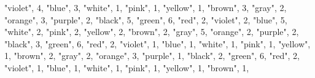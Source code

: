 \documentclass[
]{article}
\newenvironment{Shaded}{\begin{snugshade}}{\end{snugshade}}
\newcommand{\DecValTok}[1]{\textcolor[rgb]{0.00,0.00,0.81}{#1}}
\newcommand{\NormalTok}[1]{#1}
\newcommand{\StringTok}[1]{\textcolor[rgb]{0.31,0.60,0.02}{#1}}
\begin{document}
\begin{Shaded}
\begin{Highlighting}[]
  \StringTok{"violet"}\NormalTok{, }\DecValTok{4}\NormalTok{,}
  \StringTok{"blue"}\NormalTok{, }\DecValTok{3}\NormalTok{,}
  \StringTok{"white"}\NormalTok{, }\DecValTok{1}\NormalTok{,}
  \StringTok{"pink"}\NormalTok{, }\DecValTok{1}\NormalTok{,}
  \StringTok{"yellow"}\NormalTok{, }\DecValTok{1}\NormalTok{,}
  \StringTok{"brown"}\NormalTok{, }\DecValTok{3}\NormalTok{,}
  \StringTok{"gray"}\NormalTok{, }\DecValTok{2}\NormalTok{,}
  \StringTok{"orange"}\NormalTok{, }\DecValTok{3}\NormalTok{,}
  \StringTok{"purple"}\NormalTok{, }\DecValTok{2}\NormalTok{,}
    \StringTok{"black"}\NormalTok{, }\DecValTok{5}\NormalTok{,}
  \StringTok{"green"}\NormalTok{, }\DecValTok{6}\NormalTok{,}
  \StringTok{"red"}\NormalTok{, }\DecValTok{2}\NormalTok{,}
  \StringTok{"violet"}\NormalTok{, }\DecValTok{2}\NormalTok{,}
  \StringTok{"blue"}\NormalTok{, }\DecValTok{5}\NormalTok{,}
  \StringTok{"white"}\NormalTok{, }\DecValTok{2}\NormalTok{,}
  \StringTok{"pink"}\NormalTok{, }\DecValTok{2}\NormalTok{,}
  \StringTok{"yellow"}\NormalTok{, }\DecValTok{2}\NormalTok{,}
  \StringTok{"brown"}\NormalTok{, }\DecValTok{2}\NormalTok{,}
  \StringTok{"gray"}\NormalTok{, }\DecValTok{5}\NormalTok{,}
  \StringTok{"orange"}\NormalTok{, }\DecValTok{2}\NormalTok{,}
  \StringTok{"purple"}\NormalTok{, }\DecValTok{2}\NormalTok{,}
    \StringTok{"black"}\NormalTok{, }\DecValTok{3}\NormalTok{,}
  \StringTok{"green"}\NormalTok{, }\DecValTok{6}\NormalTok{,}
  \StringTok{"red"}\NormalTok{, }\DecValTok{2}\NormalTok{,}
  \StringTok{"violet"}\NormalTok{, }\DecValTok{1}\NormalTok{,}
  \StringTok{"blue"}\NormalTok{, }\DecValTok{1}\NormalTok{,}
  \StringTok{"white"}\NormalTok{, }\DecValTok{1}\NormalTok{,}
  \StringTok{"pink"}\NormalTok{, }\DecValTok{1}\NormalTok{,}
  \StringTok{"yellow"}\NormalTok{, }\DecValTok{1}\NormalTok{,}
  \StringTok{"brown"}\NormalTok{, }\DecValTok{2}\NormalTok{,}
  \StringTok{"gray"}\NormalTok{, }\DecValTok{2}\NormalTok{,}
  \StringTok{"orange"}\NormalTok{, }\DecValTok{3}\NormalTok{,}
  \StringTok{"purple"}\NormalTok{, }\DecValTok{1}\NormalTok{,}
    \StringTok{"black"}\NormalTok{, }\DecValTok{2}\NormalTok{,}
  \StringTok{"green"}\NormalTok{, }\DecValTok{6}\NormalTok{,}
  \StringTok{"red"}\NormalTok{, }\DecValTok{2}\NormalTok{,}
  \StringTok{"violet"}\NormalTok{, }\DecValTok{1}\NormalTok{,}
  \StringTok{"blue"}\NormalTok{, }\DecValTok{1}\NormalTok{,}
  \StringTok{"white"}\NormalTok{, }\DecValTok{1}\NormalTok{,}
  \StringTok{"pink"}\NormalTok{, }\DecValTok{1}\NormalTok{,}
  \StringTok{"yellow"}\NormalTok{, }\DecValTok{1}\NormalTok{,}
  \StringTok{"brown"}\NormalTok{, }\DecValTok{1}\NormalTok{,}

\end{Highlighting}
\end{Shaded}
\end{document}
